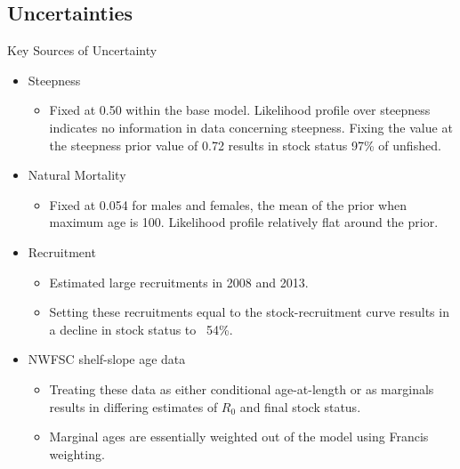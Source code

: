 \documentclass[pdf]{beamer}\usepackage[]{graphicx}\usepackage[]{color}
\begin{document}

\subsection{Uncertainties}
\begin{frame}{Key Sources of Uncertainty}
  \begin{itemize}
    \item Steepness
    \begin{itemize}
      \item Fixed at 0.50 within the base model.  Likelihood profile over steepness indicates no information in data concerning steepness.  Fixing the value at the steepness prior value of 0.72 results in stock status 97\% of unfished.
    \end{itemize}
    \item Natural Mortality
      \begin{itemize}
        \item Fixed at 0.054 for males and females, the mean of the prior when maximum age is 100.  Likelihood profile relatively flat around the prior.
      \end{itemize}
    \item Recruitment 
      \begin{itemize} 
        \item Estimated large recruitments in 2008 and 2013. 
        \item Setting these recruitments equal to the stock-recruitment curve results in a decline in stock status to ~54\%.
      \end{itemize}
    \item{NWFSC shelf-slope age data}
      \begin{itemize}
        \item Treating these data as either conditional age-at-length or as marginals results in differing estimates of $R_0$ and final stock status.
        \item Marginal ages are essentially weighted out of the model using Francis weighting.
      \end{itemize}
  \end{itemize}
\end{frame}
\end{document}
